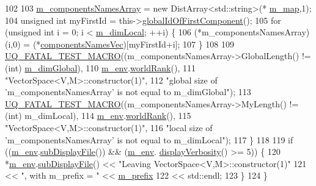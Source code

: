 \begin{DoxyCode}
102 
103     \hyperlink{class_q_u_e_s_o_1_1_vector_space_a6bcd9c13374cda32f043a93e171aeabf}{m\_componentsNamesArray} = \textcolor{keyword}{new} DistArray<std::string>(*
      \hyperlink{class_q_u_e_s_o_1_1_vector_space_a752194a4dc937db4db4df2a3b207d3b9}{m\_map},1);
104     \textcolor{keywordtype}{unsigned} \textcolor{keywordtype}{int} myFirstId = this->\hyperlink{class_q_u_e_s_o_1_1_vector_space_a6cfb48f3058abca35b23c65147217f64}{globalIdOfFirstComponent}();
105     \textcolor{keywordflow}{for} (\textcolor{keywordtype}{unsigned} \textcolor{keywordtype}{int} i = 0; i < \hyperlink{class_q_u_e_s_o_1_1_vector_space_aa6db91aca8a1f79e27d2f472528850bb}{m\_dimLocal}; ++i) \{
106       (*m\_componentsNamesArray)(i,0) = (*\hyperlink{class_q_u_e_s_o_1_1_vector_space_aa315ff4efb4be69a64e341e3ebddca56}{componentsNamesVec})[myFirstId+i];
107     \}
108 
109     \hyperlink{_defines_8h_a56d63d18d0a6d45757de47fcc06f574d}{UQ\_FATAL\_TEST\_MACRO}((m\_componentsNamesArray->GlobalLength() != (int) 
      \hyperlink{class_q_u_e_s_o_1_1_vector_space_ad3efef4a407fdc5c98fded11f2f2444e}{m\_dimGlobal}),
110                         \hyperlink{class_q_u_e_s_o_1_1_vector_set_a77f3b57109bc1d89b4111f47458df770}{m\_env}.\hyperlink{class_q_u_e_s_o_1_1_base_environment_a78b57112bbd0e6dd0e8afec00b40ffa7}{worldRank}(),
111                         \textcolor{stringliteral}{"VectorSpace<V,M>::constructor(1)"},
112                         \textcolor{stringliteral}{"global size of 'm\_componentsNamesArray' is not equal to m\_dimGlobal"});
113     \hyperlink{_defines_8h_a56d63d18d0a6d45757de47fcc06f574d}{UQ\_FATAL\_TEST\_MACRO}((m\_componentsNamesArray->MyLength() != (int) m\_dimLocal),
114                         \hyperlink{class_q_u_e_s_o_1_1_vector_set_a77f3b57109bc1d89b4111f47458df770}{m\_env}.\hyperlink{class_q_u_e_s_o_1_1_base_environment_a78b57112bbd0e6dd0e8afec00b40ffa7}{worldRank}(),
115                         \textcolor{stringliteral}{"VectorSpace<V,M>::constructor(1)"},
116                         \textcolor{stringliteral}{"local size of 'm\_componentsNamesArray' is not equal to m\_dimLocal"});
117   \}
118 
119   \textcolor{keywordflow}{if} ((\hyperlink{class_q_u_e_s_o_1_1_vector_set_a77f3b57109bc1d89b4111f47458df770}{m\_env}.\hyperlink{class_q_u_e_s_o_1_1_base_environment_a8a0064746ae8dddfece4229b9ad374d6}{subDisplayFile}()) && (\hyperlink{class_q_u_e_s_o_1_1_vector_set_a77f3b57109bc1d89b4111f47458df770}{m\_env}.
      \hyperlink{class_q_u_e_s_o_1_1_base_environment_a1fe5f244fc0316a0ab3e37463f108b96}{displayVerbosity}() >= 5)) \{
120     *\hyperlink{class_q_u_e_s_o_1_1_vector_set_a77f3b57109bc1d89b4111f47458df770}{m\_env}.\hyperlink{class_q_u_e_s_o_1_1_base_environment_a8a0064746ae8dddfece4229b9ad374d6}{subDisplayFile}() << \textcolor{stringliteral}{"Leaving VectorSpace<V,M>::constructor(1)"}
121                             << \textcolor{stringliteral}{", with m\_prefix = "} << \hyperlink{class_q_u_e_s_o_1_1_vector_set_a472995c02b59c8f3cd77230b39535cca}{m\_prefix}
122                             << std::endl;
123   \}
124 \}
\end{DoxyCode}
